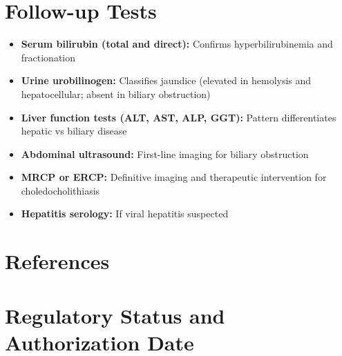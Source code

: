 \section*{Follow-up Tests}
\begin{itemize}
  \item \textbf{Serum bilirubin (total and direct):} Confirms hyperbilirubinemia and fractionation
  \item \textbf{Urine urobilinogen:} Classifies jaundice (elevated in hemolysis and hepatocellular; absent in biliary obstruction)
  \item \textbf{Liver function tests (ALT, AST, ALP, GGT):} Pattern differentiates hepatic vs biliary disease
  \item \textbf{Abdominal ultrasound:} First-line imaging for biliary obstruction
  \item \textbf{MRCP or ERCP:} Definitive imaging and therapeutic intervention for choledocholithiasis
  \item \textbf{Hepatitis serology:} If viral hepatitis suspected
\end{itemize}

\section*{References}



\clearpage
\section*{Regulatory Status and Authorization Date}

\clearpage

